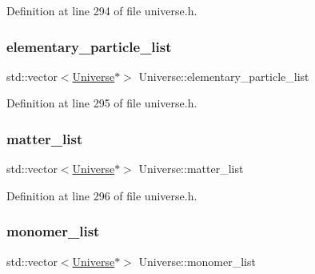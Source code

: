 Definition at line 294 of file universe.\+h.

\mbox{\label{class_universe_aeb2e63cf49f0b5595e6c15109863bd3b}} 
\subsubsection{\texorpdfstring{elementary\+\_\+particle\+\_\+list}{elementary\_particle\_list}}
{\footnotesize\ttfamily std\+::vector$<$\hyperlink{class_universe}{Universe}$\ast$$>$ Universe\+::elementary\+\_\+particle\+\_\+list\hspace{0.3cm}{\ttfamily [protected]}}



Definition at line 295 of file universe.\+h.

\mbox{\label{class_universe_a409650bc0425fc22c7713487a2a6dd8e}} 
\subsubsection{\texorpdfstring{matter\+\_\+list}{matter\_list}}
{\footnotesize\ttfamily std\+::vector$<$\hyperlink{class_universe}{Universe}$\ast$$>$ Universe\+::matter\+\_\+list\hspace{0.3cm}{\ttfamily [protected]}}



Definition at line 296 of file universe.\+h.

\mbox{\label{class_universe_a3d55ba29f95a9793b69c01f7942eca9f}} 
\subsubsection{\texorpdfstring{monomer\+\_\+list}{monomer\_list}}
{\footnotesize\ttfamily std\+::vector$<$\hyperlink{class_universe}{Universe}$\ast$$>$ Universe\+::monomer\+\_\+list\hspace{0.3cm}{\ttfamily [protected]}}



